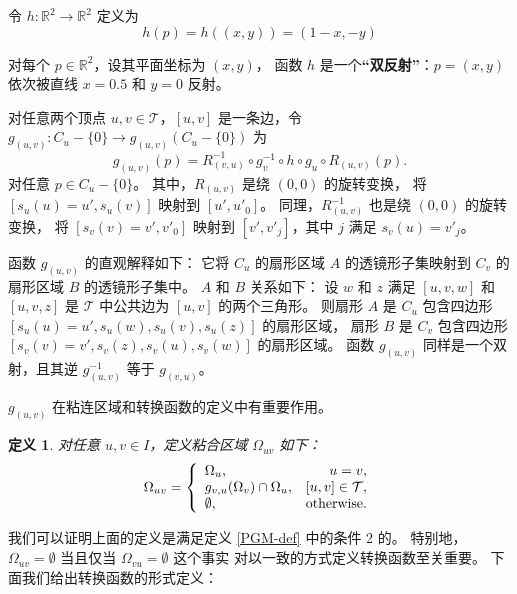 \documentclass{ctexart}
\newtheorem{Def}{定义}
\begin{document}
		令 $h:\mathbb{R}^2\rightarrow \mathbb{R}^2$ 定义为
		\begin{equation}
			h(p) = h((x,y)) = (1-x, -y)
		\end{equation}

		对每个 $p\in \mathbb{R}^2$，设其平面坐标为 $(x,y)$，
		函数 $h$ 是一个\textbf{“双反射”}：$p=(x,y)$ 依次被直线 $x=0.5$ 和 $y=0$ 反射。

		对任意两个顶点 $u,v\in \mathcal{T}$，$[u,v]$ 是一条边，令
		$g_{(u,v)}: C_u-\{0\}\rightarrow g_{(u,v)}(C_u-\{0\})$
		为
		\begin{equation}
			g_{(u,v)}(p) = R_{(v,u)}^{-1}\circ g_v^{-1}\circ h\circ g_u\circ R_{(u,v)}(p).
		\end{equation}
		对任意 $p\in C_u-\{0\}$。
		其中，$R_{(u,v)}$ 是绕 $(0,0)$ 的旋转变换，
		将 $[s_u(u) = u', s_u(v)]$ 映射到 $[u',u'_0]$。
		同理，$R_{(u,v)}^{-1}$ 也是绕 $(0,0)$ 的旋转变换，
		将 $[s_v(v) = v', v'_0]$ 映射到 $[v',v'_j]$，其中 $j$ 满足 $s_v(u) = v'_j$。

		函数 $g_{(u,v)}$ 的直观解释如下：
		它将 $C_u$ 的扇形区域 $A$ 的透镜形子集映射到 $C_v$ 的扇形区域 $B$ 的透镜形子集中。
		$A$ 和 $B$ 关系如下：
		设 $w$ 和 $z$ 满足 $[u,v,w]$ 和 $[u,v,z]$ 是 $\mathcal{T}$ 中公共边为 $[u,v]$ 的两个三角形。
		则扇形 $A$ 是 $C_u$ 包含四边形 $[s_u(u)=u',s_u(w),s_u(v),s_u(z)]$ 的扇形区域，
		扇形 $B$ 是 $C_v$ 包含四边形 $[s_v(v)=v',s_v(z),s_v(u),s_v(w)]$ 的扇形区域。
		函数 $g_{(u,v)}$ 同样是一个双射，且其逆 $g_{(u,v)}^{-1}$ 等于 $g_{(v,u)}$。
		
		$g_{(u,v)}$ 在粘连区域和转换函数的定义中有重要作用。

		\begin{Def}\label{GD-def}
			对任意 $u,v\in I$，定义粘合区域 $\Omega_{uv}$ 如下：
			\begin{equation}
				\Omega_{uv} = 
				\begin{aligned}
					\left\{
						\begin{array}{lr}
							\Omega_u, & u = v, \\
							g_{v,u}(\Omega_v)\cap \Omega_u, & [u,v]\in \mathcal{T}, \\
							\emptyset, & \rm{otherwise}.
						\end{array}
					\right.
				\end{aligned}
			\end{equation}
		\end{Def}
		我们可以证明上面的定义是满足定义 \ref{PGM-def} 中的条件 2 的。
		特别地，$\Omega_{uv} = \emptyset$ 当且仅当 $\Omega_{vu} = \emptyset$ 这个事实
		对以一致的方式定义转换函数至关重要。
		下面我们给出转换函数的形式定义：
		
\end{document}
